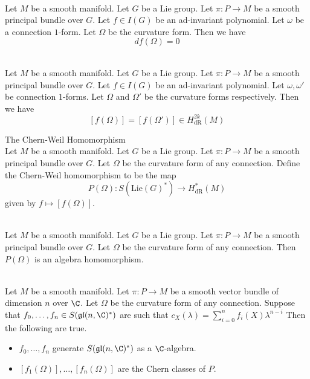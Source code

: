 \documentclass[a4paper]{article}
\begin{document}
\begin{lmm}{}{}\\
Let $M$ be a smooth manifold. Let $G$ be a Lie group. Let $\pi:P\to M$ be a smooth principal bundle over $G$. Let $f\in I(G)$ be an ad-invariant polynomial. Let $\omega$ be a connection $1$-form. Let $\Omega$ be the curvature form. Then we have $$df(\Omega)=0$$
\end{lmm}

\begin{lmm}{}{}\\
Let $M$ be a smooth manifold. Let $G$ be a Lie group. Let $\pi:P\to M$ be a smooth principal bundle over $G$. Let $f\in I(G)$ be an ad-invariant polynomial. Let $\omega,\omega'$ be connection $1$-forms. Let $\Omega$ and $\Omega'$ be the curvature forms respectively. Then we have $$[f(\Omega)]=[f(\Omega')]\in H_\text{dR}^{2k}(M)$$
\end{lmm}

\begin{defn}{The Chern-Weil Homomorphism}{}\\
Let $M$ be a smooth manifold. Let $G$ be a Lie group. Let $\pi:P\to M$ be a smooth principal bundle over $G$. Let $\Omega$ be the curvature form of any connection. Define the Chern-Weil homomorphism to be the map $$P(\Omega):S(\text{Lie}(G)^\ast)\to H_\text{dR}^\ast(M)$$ given by $f\mapsto[f(\Omega)]$. 
\end{defn}

\begin{lmm}{}{}\\
Let $M$ be a smooth manifold. Let $G$ be a Lie group. Let $\pi:P\to M$ be a smooth principal bundle over $G$. Let $\Omega$ be the curvature form of any connection. Then $P(\Omega)$ is an algebra homomorphism. 
\end{lmm}

\begin{prp}{}{}\\
Let $M$ be a smooth manifold. Let $\pi:P\to M$ be a smooth vector bundle of dimension $n$ over $\C$. Let $\Omega$ be the curvature form of any connection. Suppose that $f_0,\dots,f_n\in S(\mathfrak{gl}(n,\C)^\ast)$ are such that $c_X(\lambda)=\sum_{i=0}^nf_i(X)\lambda^{n-i}$ Then the following are true. 
\begin{itemize}
\item $f_0,\dots,f_n$ generate $S(\mathfrak{gl}(n,\C)^\ast)$ as a $\C$-algebra. 
\item $[f_1(\Omega)],\dots,[f_n(\Omega)]$ are the Chern classes of $P$. 
\end{itemize}
\end{prp}
\end{document}
